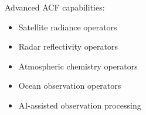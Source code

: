 Advanced ACF capabilities:


\begin{itemize}

\item Satellite radiance operators

\item Radar reflectivity operators

\item Atmospheric chemistry operators

\item Ocean observation operators

\item AI-assisted observation processing

\end{itemize}
